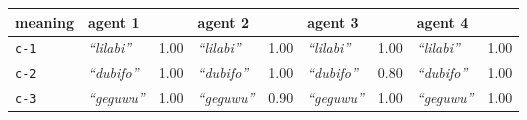 
{\footnotesize\renewcommand{\arraystretch}{1.5}
\begin{tabular}{@{}p{1.2cm}|p{1.6cm}@{}p{0.8cm}@{}|p{1.6cm}@{}p{0.8cm}@{}|p{1.6cm}@{}p{0.8cm}@{}|p{1.6cm}@{}p{0.8cm}@{}}
meaning & agent 1 &  & agent 2 &  & agent 3 &  & agent 4 & \\
\hline
\texttt{c-1}&\textit{``lilabi''}
&1.00&\textit{``lilabi''}
&1.00&\textit{``lilabi''}
&1.00&\textit{``lilabi''}
&1.00\\
\hline
\texttt{c-2}&\textit{``dubifo''}
&1.00&\textit{``dubifo''}
&1.00&\textit{``dubifo''}
&0.80&\textit{``dubifo''}
&1.00\\
\hline
\texttt{c-3}&\textit{``geguwu''}
&1.00&\textit{``geguwu''}
&0.90&\textit{``geguwu''}
&1.00&\textit{``geguwu''}
&1.00\\
\end{tabular}}

